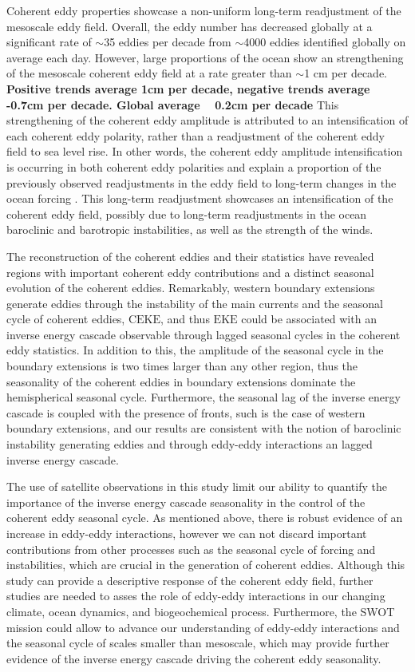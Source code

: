\documentclass[draft,linenumbers]{agujournal2019}
\newcommand{\EKE}{\textrm{EKE}}
\newcommand{\CEKE}{\textrm{CEKE}}
\begin{document}
	Coherent eddy properties showcase a non-uniform long-term readjustment of the mesoscale eddy field. 
	Overall, the eddy number has decreased globally at a significant rate of $\sim$35 eddies per decade from $\sim$4000 eddies identified globally on average each day. 
	However, large proportions of the ocean show an strengthening of the mesoscale coherent eddy field at a rate greater than $\sim$1 cm per decade. \textbf{Positive trends average 1cm per decade, negative trends average -0.7cm per decade. Global average ~ 0.2cm per decade}
	This strengthening of the coherent eddy amplitude is attributed to an intensification of each coherent eddy polarity, rather than a readjustment of the coherent eddy field to sea level rise. 
	In other words, the coherent eddy amplitude intensification is occurring in both coherent eddy polarities and explain a proportion of the previously observed readjustments in the eddy field to long-term changes in the ocean forcing \citep{Hu_acceleration_2020,Wunsch_speeding_2020,Martinez_Kinetic_2021}. 
	This long-term readjustment showcases an intensification of the coherent eddy field, possibly due to long-term readjustments in the ocean baroclinic and barotropic instabilities, as well as the strength of the winds.
	
	The reconstruction of the coherent eddies and their statistics have revealed regions with important coherent eddy contributions and a distinct seasonal evolution of the coherent eddies. 
	Remarkably, western boundary extensions generate eddies through the instability of the main currents and the seasonal cycle of coherent eddies, $\CEKE$, and thus $\EKE$ could be associated with an inverse energy cascade observable through lagged seasonal cycles in the coherent eddy statistics. 
	In addition to this, the amplitude of the seasonal cycle in the boundary extensions is two times larger than any other region, thus the seasonality of the coherent eddies in boundary extensions dominate the hemispherical seasonal cycle. 
	Furthermore, the seasonal lag of the inverse energy cascade is coupled with the presence of fronts, such is the case of western boundary extensions, and our results are consistent with the notion of baroclinic instability generating eddies and through eddy-eddy interactions an lagged inverse energy cascade.
	
	The use of satellite observations in this study limit our ability to quantify the importance of the inverse energy cascade seasonality in the control of the coherent eddy seasonal cycle. 
	As mentioned above, there is robust evidence of an increase in eddy-eddy interactions, however we can not discard important contributions from other processes such as the seasonal cycle of forcing and instabilities, which are crucial in the generation of coherent eddies. Although this study can provide a descriptive response of the coherent eddy field, further studies are needed to asses the role of eddy-eddy interactions in our changing climate, ocean dynamics, and biogeochemical process. Furthermore, the SWOT mission could allow to advance our understanding of eddy-eddy interactions and the seasonal cycle of scales smaller than mesoscale, which may provide further evidence of the inverse energy cascade driving the coherent eddy seasonality.
\end{document}
